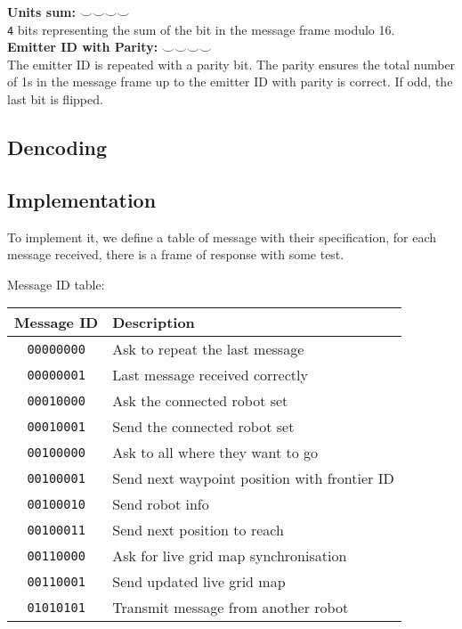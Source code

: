 \documentclass[../main.tex]{subfiles}
\begin{document}
\textbf{Units sum:} $\smallsmile \smallsmile \smallsmile \smallsmile$\\
\texttt{4} bits representing the sum of the bit in the message frame modulo 16. \\ 

\textbf{Emitter ID with Parity:} $\smallsmile \smallsmile \smallsmile \smallsmile$\\
The emitter ID is repeated with a parity bit. The parity ensures the total number of 1s in the message frame up to the emitter ID with parity is correct. If odd, the last bit is flipped. \\



\subsection{Dencoding}


\subsection{Implementation}

To implement it, we define a table of message with their specification, for each message received, there is a frame of response with some test.


Message ID table:
\begin{table}[H]
	\centering
	\begin{tabular}{c l}
		\hline
		\textbf{Message ID} & \textbf{Description} \\
		\hline
		\texttt{00000000} & Ask to repeat the last message\\
		\texttt{00000001} & Last message received correctly\\[5pt]
		
		\texttt{00010000} & Ask the connected robot set\\
		\texttt{00010001} & Send the connected robot set\\[5pt]
		
		\texttt{00100000} & Ask to all where they want to go\\
		\texttt{00100001} & Send next waypoint position with frontier ID\\
		\texttt{00100010} & Send robot info\\
		\texttt{00100011} & Send next position to reach\\[5pt]
		
		\texttt{00110000} & Ask for live grid map synchronisation\\
		\texttt{00110001} & Send updated live grid map\\[5pt]
		
		\texttt{01010101} & Transmit message from another robot\\
		\hline
	\end{tabular}
\end{table}
\end{document}
